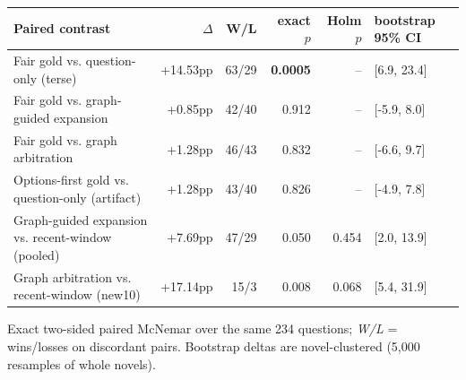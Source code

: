 \small
\begin{tabularx}{\linewidth}{L rrrrR}
\toprule
Paired contrast & $\Delta$ & W/L & exact $p$ & Holm $p$ & bootstrap 95\% CI \\
\midrule
Fair gold vs. question-only (terse) & +14.53pp & 63/29 & \textbf{0.0005} & -- & [6.9, 23.4] \\
Fair gold vs. graph-guided expansion & +0.85pp & 42/40 & 0.912 & -- & [-5.9, 8.0] \\
Fair gold vs. graph arbitration & +1.28pp & 46/43 & 0.832 & -- & [-6.6, 9.7] \\
Options-first gold vs. question-only (artifact) & +1.28pp & 43/40 & 0.826 & -- & [-4.9, 7.8] \\
\midrule
Graph-guided expansion vs. recent-window (pooled) & +7.69pp & 47/29 & 0.050 & 0.454 & [2.0, 13.9] \\
Graph arbitration vs. recent-window (new10) & +17.14pp & 15/3 & 0.008 & 0.068 & [5.4, 31.9] \\
\bottomrule
\end{tabularx}
\vspace{2pt}\begin{scriptsize}Exact two-sided paired McNemar over the same 234 questions; \textit{W/L} = wins/losses on discordant pairs. Bootstrap deltas are novel-clustered (5,000 resamples of whole novels).\end{scriptsize}
